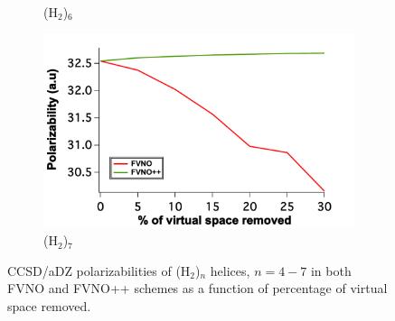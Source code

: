 \begin{figure}
\begin{subfigure}{.5\textwidth}
  \caption{(H$_2$)$_6$}
  \label{fig:sfig3}
\end{subfigure}%
\begin{subfigure}{.5\textwidth}
  \centering
  \includegraphics[width=.9\linewidth]{figures_fvno++/fvno++_h2_7_adz_polar.pdf}
  \caption{(H$_2$)$_7$}
  \label{fig:sfig4}
\end{subfigure}
\caption{{\footnotesize CCSD/aDZ polarizabilities of (H$_2$)$_n$ helices, $ n = 4-7$ in both FVNO and FVNO++ schemes as a function of
percentage of virtual space removed.}}
\label{fig:fvno++_polar_h2_n}
\end{figure}
